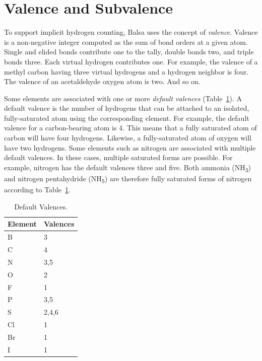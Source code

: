 \documentclass{article}
\begin{document}
\section*{Valence and Subvalence}
\label{valence-and-subvalence}

To support implicit hydrogen counting, Balsa uses the concept of \textit{valence}. Valence is a non-negative integer computed as the sum of bond orders at a given atom. Single and elided bonds contribute one to the tally, double bonds two, and triple bonds three. Each virtual hydrogen contributes one. For example, the valence of a methyl carbon having three virtual hydrogens and a hydrogen neighbor is four. The valence of an acetaldehyde oxygen atom is two. And so on.

Some elements are associated with one or more \textit{default valences} (Table~\ref{table:default-valences}). A default valence is the number of hydrogens that can be attached to an isolated, fully-saturated atom using the corresponding element. For example, the default valence for a carbon-bearing atom is 4. This means that a fully saturated atom of carbon will have four hydrogens. Likewise, a fully-saturated atom of oxygen will have two hydrogens. Some elements such as nitrogen are associated with multiple default valences. In these cases, multiple saturated forms are possible. For example, nitrogen has the default valences three and five. Both ammonia (NH\textsubscript{3}) and nitrogen pentahydride (NH\textsubscript{5}) are therefore fully saturated forms of nitrogen according to Table~\ref{table:default-valences}.

\begin{table}
    \caption{Default Valences.}
    \centering
    \begin{tabular}{l l}
        \hline
        Element & Valences \\
        \hline
        B & 3 \\
        C & 4 \\
        N & 3,5 \\
        O & 2 \\
        F & 1 \\
        P & 3,5 \\
        S & 2,4,6 \\
        Cl & 1 \\
        Br & 1 \\
        I & 1 \\
        \hline
    \end{tabular}
    \label{table:default-valences}
\end{table}
\end{document}
